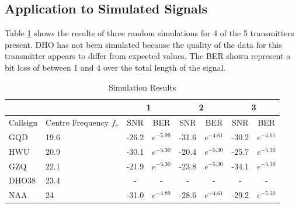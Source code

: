 \subsection{Application to Simulated Signals}\label{sec:simsignals}

Table \ref{tab:simresults1} shows the results of three random simulations for 4 of the 5 transmitters present. DHO has not been simulated because the quality of the data for this transmitter appears to differ from expected values. The BER shown represent a bit loss of between 1 and 4 over the total length of the signal.


\begin{table}[h!]
\centering
\begin{tabular}{l|l|c|c|c|c|c|c}
         &                        & \multicolumn{2}{c}{1} & \multicolumn{2}{|c}{2} & \multicolumn{2}{|c}{3} \\
         \hline
Callsign & Centre Frequency $f_c$ & SNR    & BER          & SNR    & BER          & SNR    & BER          \\
\hline
GQD      & 19.6                   & -26.2  & $e^{-5.99}$ & -31.6  & $e^{-4.61}$ & -30.2  & $e^{-4.61}$ \\
HWU      & 20.9                   & -30.1  & $e^{-5.30}$ & -20.4  & $e^{-5.30}$ & -25.7  & $e^{-5.30}$ \\
GZQ      & 22.1                   & -21.9  & $e^{-5.30}$ & -23.8  & $e^{-5.30}$ & -34.1  & $e^{-5.30}$ \\
DHO38    & 23.4                   & -      & -            & -      & -            & -      & -            \\
NAA      & 24                     & -31.0  & $e^{-4.89}$ & -28.6  & $e^{-4.61}$ & -29.2  & $e^{-5.30}$
\end{tabular}
\caption{Simulation Results}
\label{tab:simresults1}
\end{table}


